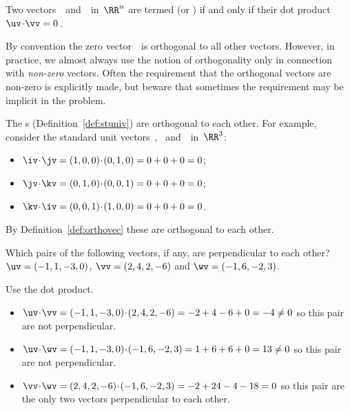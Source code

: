 \begin{definition} \label{def:orthovec}
Two vectors~\uv\ and~\vv\ in~\(\RR^n\) are termed
 (or )
if and only if their dot product \(\uv\cdot\vv=0\)\,.
\end{definition}

By convention the zero vector~\ov\ is orthogonal to all other vectors.
However, in practice, we almost always use the notion of orthogonality only in connection with \emph{non-zero} vectors.
Often the requirement that the orthogonal vectors are non-zero is explicitly made, but beware that sometimes the requirement may be implicit in the problem.


\begin{example} \label{eg:}
The s (Definition~\ref{def:stuniv}) are orthogonal to each other.
For example, consider the standard unit vectors~\iv, \jv\ and~\kv\ in~\(\RR^3\):
\begin{itemize}
\item \(\iv\cdot\jv=(1,0,0)\cdot(0,1,0)=0+0+0=0\);
\item \(\jv\cdot\kv=(0,1,0)\cdot(0,0,1)=0+0+0=0\);
\item \(\kv\cdot\iv=(0,0,1)\cdot(1,0,0)=0+0+0=0\).
\end{itemize}
By Definition~\ref{def:orthovec} these are orthogonal to each other.
\end{example}


\begin{example} \label{eg:}
Which pairs of the following vectors, if any, are perpendicular to each other?
\(\uv=(-1,1,-3,0)\), \(\vv=(2,4,2,-6)\) and \(\wv=(-1,6,-2,3)\).
\begin{solution} 
Use the dot product.
\begin{itemize}
\item \(\uv\cdot\vv =(-1,1,-3,0)\cdot(2,4,2,-6) =-2+4-6+0 =-4 \neq0\) so this pair are not perpendicular. 
\item \(\uv\cdot\wv =(-1,1,-3,0)\cdot(-1,6,-2,3) =1+6+6+0 =13 \neq0\) so this pair are not perpendicular. 
\item \(\vv\cdot\wv =(2,4,2,-6)\cdot(-1,6,-2,3) =-2+24-4-18 =0\) so this pair are the only two vectors perpendicular to each other. 
\end{itemize}
\end{solution}
\end{example}




